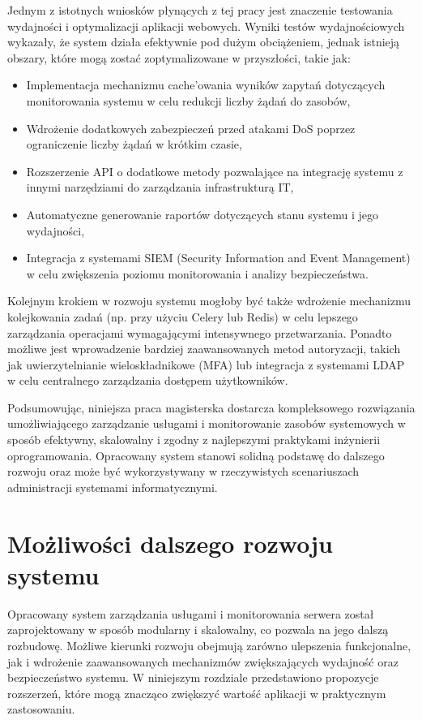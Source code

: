 Jednym z istotnych wniosków płynących z tej pracy jest znaczenie testowania wydajności i optymalizacji aplikacji webowych. Wyniki testów wydajnościowych wykazały, że system działa efektywnie pod dużym obciążeniem, jednak istnieją obszary, które mogą zostać zoptymalizowane w przyszłości, takie jak:
\begin{itemize}
    \item Implementacja mechanizmu cache’owania wyników zapytań dotyczących monitorowania systemu w celu redukcji liczby żądań do zasobów,
    \item Wdrożenie dodatkowych zabezpieczeń przed atakami DoS poprzez ograniczenie liczby żądań w krótkim czasie,
    \item Rozszerzenie API o dodatkowe metody pozwalające na integrację systemu z innymi narzędziami do zarządzania infrastrukturą IT,
    \item Automatyczne generowanie raportów dotyczących stanu systemu i jego wydajności,
    \item Integracja z systemami SIEM (Security Information and Event Management) w celu zwiększenia poziomu monitorowania i analizy bezpieczeństwa.
\end{itemize}

Kolejnym krokiem w rozwoju systemu mogłoby być także wdrożenie mechanizmu kolejkowania zadań (np. przy użyciu Celery lub Redis) w celu lepszego zarządzania operacjami wymagającymi intensywnego przetwarzania. Ponadto możliwe jest wprowadzenie bardziej zaawansowanych metod autoryzacji, takich jak uwierzytelnianie wieloskładnikowe (MFA) lub integracja z systemami LDAP w celu centralnego zarządzania dostępem użytkowników.

Podsumowując, niniejsza praca magisterska dostarcza kompleksowego rozwiązania umożliwiającego zarządzanie usługami i monitorowanie zasobów systemowych w sposób efektywny, skalowalny i zgodny z najlepszymi praktykami inżynierii oprogramowania. Opracowany system stanowi solidną podstawę do dalszego rozwoju oraz może być wykorzystywany w rzeczywistych scenariuszach administracji systemami informatycznymi.


\section{Możliwości dalszego rozwoju systemu}

Opracowany system zarządzania usługami i monitorowania serwera został zaprojektowany w sposób modularny i skalowalny, co pozwala na jego dalszą rozbudowę. Możliwe kierunki rozwoju obejmują zarówno ulepszenia funkcjonalne, jak i wdrożenie zaawansowanych mechanizmów zwiększających wydajność oraz bezpieczeństwo systemu. W niniejszym rozdziale przedstawiono propozycje rozszerzeń, które mogą znacząco zwiększyć wartość aplikacji w praktycznym zastosowaniu.

